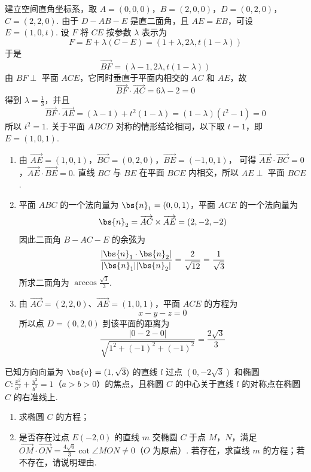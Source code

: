 \begin{solution}
建立空间直角坐标系，取 \(A=(0,0,0)\)，\(B=(2,0,0)\)，\(D=(0,2,0)\)，\(C=(2,2,0)\).
由于 \(D-AB-E\) 是直二面角，且 \(AE=EB\)，可设 \(E=(1,0,t)\). 设 \(F\) 将 \(CE\) 按参数 \(\lambda\) 表示为
\[
F=E+\lambda(C-E)=(1+\lambda,2\lambda,t(1-\lambda))
\]
于是
\[
\overrightarrow{BF}=(\lambda-1,2\lambda,t(1-\lambda))
\]
由 \(BF\perp\) 平面 \(ACE\)，它同时垂直于平面内相交的 \(AC\) 和 \(AE\)，故
\[
\overrightarrow{BF}\cdot\overrightarrow{AC}=6\lambda-2=0
\]
得到 \(\lambda=\frac{1}{3}\)，并且
\[
\overrightarrow{BF}\cdot\overrightarrow{AE}
=(\lambda-1)+t^2(1-\lambda)=(1-\lambda)(t^2-1)=0
\]
所以 \(t^2=1\). 关于平面 \(ABCD\) 对称的情形结论相同，以下取 \(t=1\)，即 \(E=(1,0,1)\).
\begin{enumerate}
\item 由 \(\overrightarrow{AE}=(1,0,1)\)，\(\overrightarrow{BC}=(0,2,0)\)，\(\overrightarrow{BE}=(-1,0,1)\)，
可得 \(\overrightarrow{AE}\cdot\overrightarrow{BC}=0\)，\(\overrightarrow{AE}\cdot\overrightarrow{BE}=0\). 直线 \(BC\) 与 \(BE\) 在平面 \(BCE\) 内相交，所以 \(AE\perp\) 平面 \(BCE\).
\item 平面 \(ABC\) 的一个法向量为 \(\bs{n}_1=(0,0,1)\)，平面 \(ACE\) 的一个法向量为
\[
\bs{n}_2=\overrightarrow{AC}\times\overrightarrow{AE}=(2,-2,-2)
\]
因此二面角 \(B-AC-E\) 的余弦为
\[
\frac{|\bs{n}_1\cdot\bs{n}_2|}{|\bs{n}_1||\bs{n}_2|}=\frac{2}{\sqrt{12}}=\frac{1}{\sqrt{3}}
\]
所求二面角为 \(\arccos\frac{\sqrt{3}}{3}\).
\item 由 \(\overrightarrow{AC}=(2,2,0)\)、\(\overrightarrow{AE}=(1,0,1)\)，平面 \(ACE\) 的方程为
\[
x-y-z=0
\]
所以点 \(D=(0,2,0)\) 到该平面的距离为
\[
\frac{|0-2-0|}{\sqrt{1^2+(-1)^2+(-1)^2}}=\frac{2\sqrt{3}}{3}
\]
\end{enumerate}
\end{solution}


\begin{problem}
已知方向向量为 \(\bs{v} = (1, \sqrt{3})\) 的直线 \(l\) 过点 \((0, -2\sqrt{3})\) 和椭圆 \(C: \frac{x^2}{a^2} + \frac{y^2}{b^2} = 1\)（\(a > b > 0\)）的焦点，且椭圆 \(C\) 的中心关于直线 \(l\) 的对称点在椭圆 \(C\) 的右准线上.

\begin{enumerate}
\item 求椭圆 \(C\) 的方程；
\item 是否存在过点 \(E(-2,0)\) 的直线 \(m\) 交椭圆 \(C\) 于点 \(M\)，\(N\)，满足 \(\overrightarrow{OM} \cdot \overrightarrow{ON} = \frac{4\sqrt{6}}{3}\cot \angle MON \neq 0\)（\(O\) 为原点）. 若存在，求直线 \(m\) 的方程；若不存在，请说明理由.


\end{enumerate}
\end{problem}


